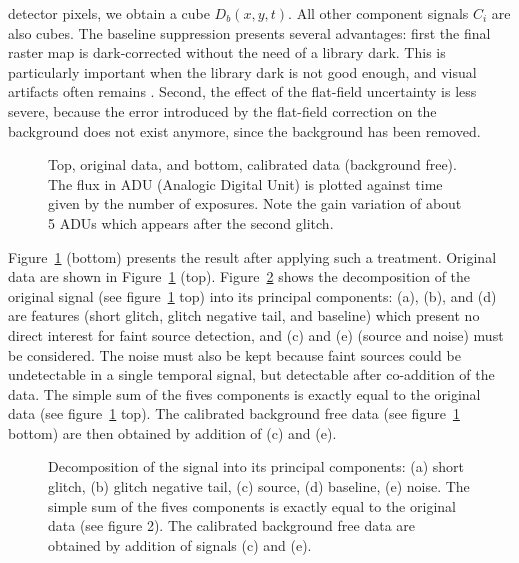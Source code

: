 detector pixels, we obtain a cube $D_b(x,y,t)$. All other component 
signals $C_i$ are also cubes.  
The baseline suppression presents several advantages: first the 
final
raster map is dark-corrected without the need of a library dark. 
This is particularly important when the library dark is  not good 
enough,
and visual artifacts often remains \cite{starck:tr_idum96}. 
Second,
the effect of the flat-field uncertainty is less severe, because the error
introduced by the flat-field correction on the background does not exist 
anymore,
since the background has been removed.  
\begin{figure}[htb]
\centerline{
\vbox{
}}
\caption{Top, original data, and bottom, calibrated data (background 
free).
The flux in ADU (Analogic Digital Unit) is plotted against time given by the number of exposures.
Note the gain variation of about 5 ADUs which appears after the 
second glitch.}
\label{fig_calib}
\end{figure}

Figure~\ref{fig_calib} (bottom) presents the result after applying 
such a  treatment. Original data are shown in Figure~\ref{fig_calib} 
(top).
Figure~\ref{fig_decomp} shows the decomposition of the
 original signal (see figure~\ref{fig_calib} top) into its principal 
components: (a), (b), and (d) are features (short glitch, glitch 
negative tail, and baseline) which present no direct interest for 
faint source detection, and
(c) and (e) (source and noise) must be considered. The noise must also
be kept because faint sources could be undetectable in a single 
temporal signal, but
detectable after co-addition of the data.
The simple sum of the fives components is exactly equal to the 
original data (see figure~\ref{fig_calib} top). The calibrated 
background free data 
(see figure~\ref{fig_calib} bottom) are then obtained by addition of 
(c) and (e).

\begin{figure}[htb]
\centerline{
\vbox{
}}
\caption{Decomposition of the signal into its principal components: 
(a) short glitch, (b) glitch negative tail, (c) source, (d) baseline, 
(e) noise. The
simple sum of the fives components is exactly equal to the original 
data (see
figure 2). The calibrated background free data are obtained by 
addition of signals (c) and (e).}
\label{fig_decomp}
\end{figure}

